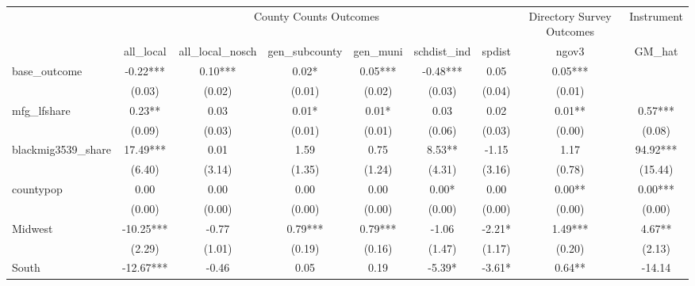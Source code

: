 {
\def\sym#1{\ifmmode^{#1}\else\(^{#1}\)\fi}
\begin{tabular}{l*{8}{c}}
\toprule
                &\multicolumn{6}{c}{County Counts Outcomes}                                               &\multicolumn{1}{c}{Directory Survey Outcomes}&\multicolumn{1}{c}{Instrument}\\\cmidrule(lr){2-7}\cmidrule(lr){8-8}\cmidrule(lr){9-9}
                &\multicolumn{1}{c}{all\_local}&\multicolumn{1}{c}{all\_local\_nosch}&\multicolumn{1}{c}{gen\_subcounty}&\multicolumn{1}{c}{gen\_muni}&\multicolumn{1}{c}{schdist\_ind}&\multicolumn{1}{c}{spdist}&\multicolumn{1}{c}{ngov3}&\multicolumn{1}{c}{GM\_hat}\\
\midrule
base\_outcome    &      -0.22***&       0.10***&       0.02*  &       0.05***&      -0.48***&       0.05   &       0.05***&              \\
                &     (0.03)   &     (0.02)   &     (0.01)   &     (0.02)   &     (0.03)   &     (0.04)   &     (0.01)   &              \\
\addlinespace
mfg\_lfshare     &       0.23** &       0.03   &       0.01*  &       0.01*  &       0.03   &       0.02   &       0.01** &       0.57***\\
                &     (0.09)   &     (0.03)   &     (0.01)   &     (0.01)   &     (0.06)   &     (0.03)   &     (0.00)   &     (0.08)   \\
\addlinespace
blackmig3539\_share&      17.49***&       0.01   &       1.59   &       0.75   &       8.53** &      -1.15   &       1.17   &      94.92***\\
                &     (6.40)   &     (3.14)   &     (1.35)   &     (1.24)   &     (4.31)   &     (3.16)   &     (0.78)   &    (15.44)   \\
\addlinespace
countypop       &       0.00   &       0.00   &       0.00   &       0.00   &       0.00*  &       0.00   &       0.00** &       0.00***\\
                &     (0.00)   &     (0.00)   &     (0.00)   &     (0.00)   &     (0.00)   &     (0.00)   &     (0.00)   &     (0.00)   \\
\addlinespace
Midwest         &     -10.25***&      -0.77   &       0.79***&       0.79***&      -1.06   &      -2.21*  &       1.49***&       4.67** \\
                &     (2.29)   &     (1.01)   &     (0.19)   &     (0.16)   &     (1.47)   &     (1.17)   &     (0.20)   &     (2.13)   \\
\addlinespace
South           &     -12.67***&      -0.46   &       0.05   &       0.19   &      -5.39*  &      -3.61*  &       0.64** &     -14.14   \\

\end{tabular}}
